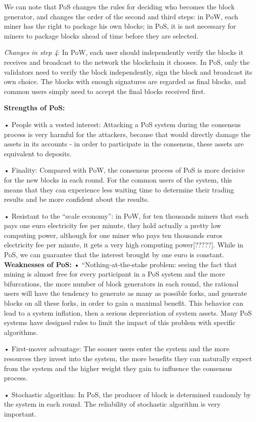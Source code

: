 \documentclass[doublespacing]{bmcart}
\begin{document}
\begin{CJK*}{UTF8}{gbsn}
	We can note that PoS changes the rules for deciding who becomes the block generator, and changes the order of the second and third steps: in PoW, each miner has the right to package his own blocks; in PoS, it is not necessary for miners to package blocks ahead of time before they are selected.
	
	\textsl{Changes in step 4}: In PoW, each user should independently verify the blocks it receives and broadcast to the network the blockchain it chooses. In PoS, only the validators need to verify the block independently, sign the block and broadcast its own choice. The blocks with enough signatures are regarded as final blocks, and common users simply need to accept the final blocks received first.

	\textbf{Strengths of PoS:}	
    \par • People with a vested interest: Attacking a PoS system during the consensus process is very harmful for the attackers, because that would directly damage the assets in its accounts - in order to participate in the consensus, these assets are equivalent to deposits.
    \par • Finality: Compared with PoW, the consensus process of PoS is more decisive for the new blocks in each round. For the common users of the system, this means that they can experience less waiting time to determine their trading results and be more confident about the results.
    \par • Resistant to the “scale economy”: in PoW, for ten thousands miners that each pays one euro electricity fee per minute, they hold actually a pretty low computing power, although for one miner who pays ten thousands euros electricity fee per minute, it gets a very high computing power[?????]. While in PoS, we can guarantee that the interest brought by one euro is constant.
    \textbf{Weaknesses of PoS:}	
    • “Nothing-at-the-stake problem: seeing the fact that mining is almost free for every participant in a PoS system and the more bifurcations, the more number of block generators in each round, the rational users will have the tendency to generate as many as possible forks, and generate blocks on all these forks, in order to gain a maximal benefit. This behavior can lead to a system inflation, then a serious depreciation of system assets. Many PoS systems have designed rules to limit the impact of this problem with specific algorithms.
    \par • First-mover advantage: The sooner users enter the system and the more resources they invest into the system, the more benefits they can naturally expect from the system and the higher weight they gain to influence the consensus process.
    \par • Stochastic algorithm: In PoS, the producer of block is determined randomly by the system in each round. The reliability of stochastic algorithm is very important.
    

\end{CJK*}
\end{document}

